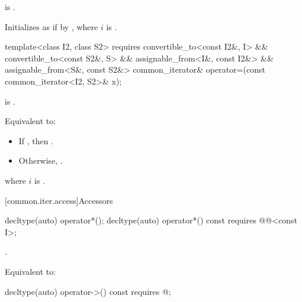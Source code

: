 \begin{itemdescr}
\pnum
\expects
{} is .

\pnum
\effects
Initializes  as if by
,
where $i$ is .
\end{itemdescr}

%
\begin{itemdecl}
template<class I2, class S2>
  requires convertible_to<const I2&, I> && convertible_to<const S2&, S> &&
           assignable_from<I&, const I2&> && assignable_from<S&, const S2&>
    common_iterator& operator=(const common_iterator<I2, S2>& x);
\end{itemdecl}

\begin{itemdescr}
\pnum
\expects
{} is .

\pnum
\effects
Equivalent to:
\begin{itemize}
\item If , then
.

\item Otherwise, .
\end{itemize}
where $i$ is .

\pnum
\returns
{}
\end{itemdescr}

[common.iter.access]{Accessors}

%
\begin{itemdecl}
decltype(auto) operator*();
decltype(auto) operator*() const
  requires @@<const I>;
\end{itemdecl}

\begin{itemdescr}
\pnum
\expects
{}.

\pnum
\effects
Equivalent to: 
\end{itemdescr}

%
\begin{itemdecl}
decltype(auto) operator->() const
  requires @\seebelow@;
\end{itemdecl}

